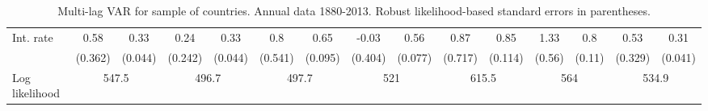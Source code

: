 \begin{table}[htbp]
\begin{tabular}{@{\extracolsep{4pt}}lcccccccccccccc@{}}
\quad Int. rate 	 &0.58 	 & 0.33 	 & 0.24 	 & 0.33 	 & 0.8 	 & 0.65 	 & -0.03 	 & 0.56 	 & 0.87 	 & 0.85 	 & 1.33 	 & 0.8 	 & 0.53 	 & 0.31	 \\ 
 		 & (0.362) 	 & (0.044) 	 & (0.242) 	 & (0.044) 	 & (0.541) 	 & (0.095) 	 & (0.404) 	 & (0.077) 	 & (0.717) 	 & (0.114) 	 & (0.56) 	 & (0.11) 	 & (0.329) 	 & (0.041) 	 \\ 
 \hline \rule{0pt}{4ex} 
  Log likelihood 	 &\multicolumn{2}{c}{547.5} 	 & \multicolumn{2}{c}{496.7} 	 & \multicolumn{2}{c}{497.7} 	 & \multicolumn{2}{c}{521} 	 & \multicolumn{2}{c}{615.5} 	 & \multicolumn{2}{c}{564} 	 & \multicolumn{2}{c}{534.9}\\ 

 \hline 	\end{tabular}		\caption{Multi-lag VAR for sample of countries. Annual data 1880-2013. Robust likelihood-based standard errors in parentheses.}
		\label{tab:all_4lag}

\end{table}